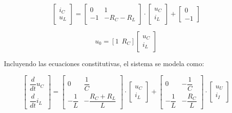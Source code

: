 \begin{equation}
    \begin{bmatrix}
        i_C \\
        u_L
    \end{bmatrix}
    =
    \begin{bmatrix}
        0 & 1 \\
        -1 & -R_C - R_L
    \end{bmatrix}
    \cdot
    \begin{bmatrix}
        u_C \\
        i_L
    \end{bmatrix}
    +
    \begin{bmatrix}
        0 \\
        -1
    \end{bmatrix}
\end{equation}


\begin{equation}
        u_0 = [1 \ \ R_C] 
    \begin{bmatrix}
        u_C \\
        i_L
    \end{bmatrix}
\end{equation}

Incluyendo las ecuaciones constitutivas, el sistema se modela como:

\begin{equation}
    \begin{bmatrix}
        \dfrac{d}{dt}u_C\\
        \dfrac{d}{dt}i_L
    \end{bmatrix}
    =
    \begin{bmatrix}
        0 & \dfrac{1}{C}\\
        -\dfrac{1}{L} & -\dfrac{R_C + R_L}{L}
    \end{bmatrix}
    \cdot
    \begin{bmatrix}
        u_C\\
        i_L
    \end{bmatrix}
    +
    \begin{bmatrix}
        0 & -\dfrac{1}{C}\\
        -\dfrac{1}{L} & -\dfrac{R_C}{L}
    \end{bmatrix}
    \cdot
    \begin{bmatrix}
        u_U\\
        i_I
    \end{bmatrix}  
\end{equation}

